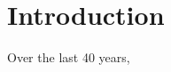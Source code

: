 \chapter{Introduction}

\noindent \lettrine[lines=2, nindent=0em]{\textcolor{UNIPDRED}{O}}{}ver the last 40 years, \lipsum

